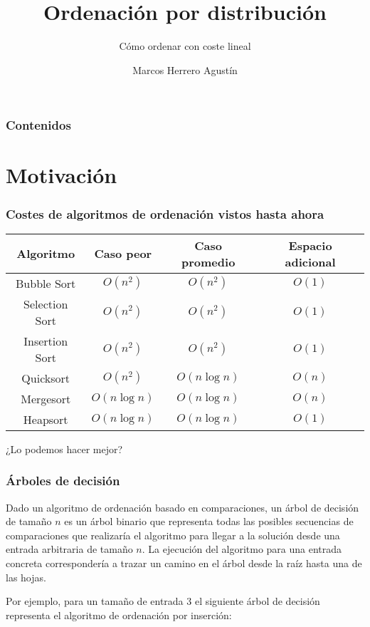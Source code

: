 \documentclass{beamer}
\title[Ordenación por distribución] %
{Ordenación por distribución}
\subtitle{Cómo ordenar con coste lineal}
\author[Marcos Herrero] %
{Marcos Herrero Agustín}
\date[] %
{}
\begin{document}
\frame{\titlepage}


\begin{frame}
\frametitle{Contenidos}
\tableofcontents
\end{frame}


\section{Motivación}

\begin{frame}
\frametitle{Costes de algoritmos de ordenación vistos hasta ahora}
\begin{tabular}{|c|c|c|c|}
	\hline
	Algoritmo & Caso peor & Caso promedio & Espacio adicional\\
	\hline
	Bubble Sort& $O(n^2)$ & $O(n^2)$ & $O(1)$ \\
	Selection Sort & $O(n^2)$ & $O(n^2)$ & $O(1)$ \\
	Insertion Sort & $O(n^2)$ & $O(n^2)$ & $O(1)$ \\
	Quicksort & $O(n^2)$ & $O(n\log n)$ & $O(n)$ \\
	Mergesort & $O(n\log n)$ & $O(n\log n)$ & $O(n)$ \\
	Heapsort & $O(n\log n)$ & $O(n\log n)$ & $O(1)$ \\
	\hline
\end{tabular}

\vspace{1cm}
\alert{¿Lo podemos hacer mejor?}
\end{frame}

\begin{frame}
\frametitle{Árboles de decisión}
Dado un algoritmo de ordenación basado en comparaciones, un \alert{árbol de decisión} de tamaño $n$ es un árbol binario que representa todas las posibles secuencias de comparaciones que realizaría el algoritmo para llegar a la solución desde una entrada arbitraria de tamaño $n$. La ejecución del algoritmo para una entrada concreta correspondería a trazar un camino en el árbol desde la raíz hasta una de las hojas.

Por ejemplo, para un tamaño de entrada $3$ el siguiente árbol de decisión representa el algoritmo de ordenación por inserción:

\centering
\scriptsize
{}
\end{frame}
\end{document}
